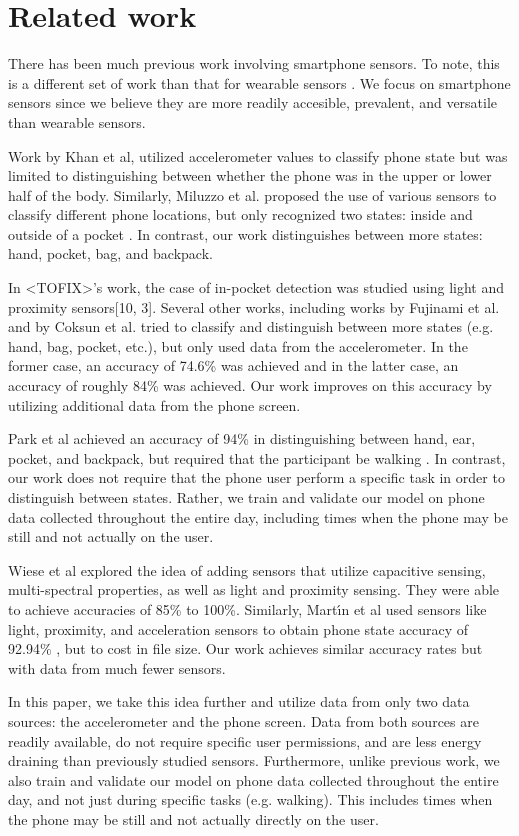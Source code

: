 \section{Related work}
There has been much previous work involving smartphone sensors.
To note, this is a different set of work than that for wearable sensors \cite{Kunze2005WhereAI}.
We focus on smartphone sensors since we believe they are more readily accesible, prevalent, and versatile than wearable sensors.

Work by Khan et al, utilized accelerometer values to classify phone state 
but was limited to distinguishing between whether the phone was in the upper or lower half of the body\cite{Khan2010}.
Similarly, Miluzzo et al. proposed the use of various sensors to classify different phone locations, 
but only recognized two states: inside and outside of a pocket \cite{Miluzzo2010}.
In contrast, our work distinguishes between more states: hand, pocket, bag, and backpack. 

 In <TOFIX>'s work, the case of in-pocket detection was studied using light and proximity sensors[10, 3].
Several other works, including works by Fujinami et al. and by Coksun et al. tried to classify and distinguish between more states (e.g. hand, bag, pocket, etc.), but only used data from the accelerometer\cite{Fujinami, Coksun15}. 
In the former case, an accuracy of 74.6\% was achieved and in the latter case, an accuracy of roughly 84\% was achieved.
Our work improves on this accuracy by utilizing additional data from the phone screen.

Park et al achieved an accuracy of 94\% in distinguishing between hand, ear, pocket, and backpack, but required that the participant be walking \cite{Park}. 
In contrast, our work does not require that the phone user perform a specific task in order to distinguish between states.
Rather, we train and validate our model on phone data collected throughout the entire day, 
 including times when the phone may be still and not actually on the user. 


Wiese et al explored the idea of adding sensors that utilize capacitive sensing,  multi-spectral properties, as well as light and proximity sensing.
They were able to achieve accuracies of 85\% to 100\%.
Similarly, Mart\'{\i}n et al used sensors like light, proximity, and acceleration sensors
to obtain phone state accuracy of 92.94\% \cite{Martin}, but to cost in file size.
Our work achieves similar accuracy rates but with data from much fewer sensors.  

In this paper, we take this idea further and utilize data from only two data sources: the accelerometer and the phone screen. 
Data from both sources are readily available, do not require specific user permissions, and are less energy draining than previously studied sensors.
Furthermore, unlike previous work, we also train and validate our model on phone data collected throughout the entire day, and not just during specific tasks (e.g. walking).
This includes times when the phone may be still and not actually directly on the user.







